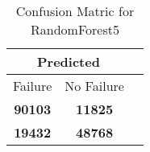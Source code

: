 \begin{table}[] 
\caption{Confusion Matric for RandomForest5} 
\label{Table: Prediction Accuracy-DMDRandomForest5OnlySunEKF-ignoreReflection-Reflection} 
\centering 
\begin{tabular} 
 {@{}ccc@{}} 
\toprule 
\multicolumn{2}{c}{\textbf{Predicted}}
 \\ \midrule 
\multicolumn{1}{|c|}{Failure} & 
\multicolumn{1}{c|}{No Failure}
 \\ \midrule 
\multicolumn{1}{|c|}{\color{green}\textbf{90103}} & 
\multicolumn{1}{c|}{\color{red}\textbf{11825}}
 \\ \midrule 
\multicolumn{1}{|c|}{\color{red}\textbf{19432}} & 
\multicolumn{1}{c|}{\color{green}\textbf{48768}}
 \\ \bottomrule 
\end{tabular} 
\end{table} 
